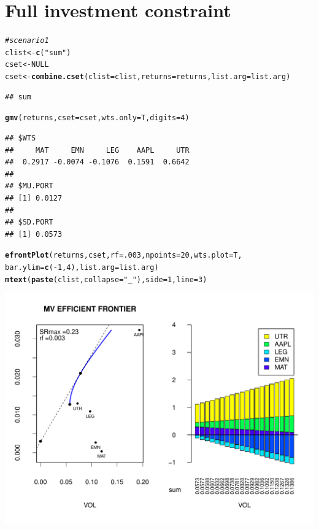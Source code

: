 \documentclass{uwstat518}\usepackage[]{graphicx}\usepackage[]{color}
\makeatletter
\def\maxwidth{ %
  \ifdim\Gin@nat@width>\linewidth
    \linewidth
  \else
    \Gin@nat@width
  \fi
}
\newcommand{\hlstr}[1]{\textcolor[rgb]{0.192,0.494,0.8}{#1}}%
\newcommand{\hlcom}[1]{\textcolor[rgb]{0.678,0.584,0.686}{\textit{#1}}}%
\newcommand{\hlkwd}[1]{\textcolor[rgb]{0.737,0.353,0.396}{\textbf{#1}}}%
\newenvironment{kframe}{%
 \def\at@end@of@kframe{}%
 \ifinner\ifhmode%
  \def\at@end@of@kframe{\end{minipage}}%
  \begin{minipage}{\columnwidth}%
 \fi\fi%
 \def\FrameCommand##1{\hskip\@totalleftmargin \hskip-\fboxsep
 \colorbox{shadecolor}{##1}\hskip-\fboxsep
     \hskip-\linewidth \hskip-\@totalleftmargin \hskip\columnwidth}%
 \MakeFramed {\advance\hsize-\width
   \@totalleftmargin\z@ \linewidth\hsize
   \@setminipage}}%
 {\par\unskip\endMakeFramed%
 \at@end@of@kframe}
\newenvironment{knitrout}{}{} %
\makeatother
\begin{document}
\section{Full investment constraint}
\begin{knitrout}
\color{fgcolor}\begin{kframe}
\begin{alltt}
\hlcom{# scenario 1}
clist <- \hlkwd{c}(\hlstr{"sum"})
cset <- NULL
cset <-\hlkwd{combine.cset}(clist=clist,returns=returns,list.arg=list.arg)
\end{alltt}
\begin{verbatim}
## sum
\end{verbatim}
\begin{alltt}
\hlkwd{gmv}(returns, cset=cset, wts.only=T,digits=4)
\end{alltt}
\begin{verbatim}
## $WTS
##     MAT     EMN     LEG    AAPL     UTR 
##  0.2917 -0.0074 -0.1076  0.1591  0.6642 
## 
## $MU.PORT
## [1] 0.0127
## 
## $SD.PORT
## [1] 0.0573
\end{verbatim}
\begin{alltt}
\hlkwd{efrontPlot}(returns, cset, rf = .003, npoints = 20,wts.plot = T,
		bar.ylim = \hlkwd{c}(-1,4),list.arg=list.arg)
\hlkwd{mtext}(\hlkwd{paste}(clist,collapse=\hlstr{"_"}),side=1,line=3)
\end{alltt}
\end{kframe}
\includegraphics[width=\maxwidth]{figure/unnamed-chunk-4} 

\end{knitrout}
\end{document}
